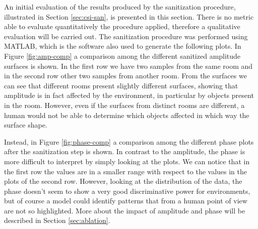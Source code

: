 \documentclass[binding=0.6cm,noexaminfo]{sapthesis}
\begin{document}
An initial evaluation of the results produced by the sanitization procedure, illustrated in Section \ref{sec:csi-san}, is presented in this section. There is no metric able to evaluate quantitatively the procedure applied, therefore a qualitative evaluation will be carried out. The sanitization procedure was performed using MATLAB, which is the software also used to generate the following plots. In Figure \ref{fig:amp-comp} a comparison among the different sanitized amplitude surfaces is shown. In the first row we have two samples from the same room and in the second row other two samples from another room. From the surfaces we can see that different rooms present slightly different surfaces, showing that amplitude is in fact affected by the environment, in particular by objects present in the room. However, even if the surfaces from distinct rooms are different, a human would not be able to determine which objects affected in which way the surface shape.

Instead, in Figure \ref{fig:phase-comp} a comparison among the different phase plots after the sanitization step is shown. In contrast to the amplitude, the phase is more difficult to interpret by simply looking at the plots. We can notice that in the first row the values are in a smaller range with respect to the values in the plots of the second row. However, looking at the distribution of the data, the phase doesn't seem to show a very good discriminative power for environments, but of course a model could identify patterns that from a human point of view are not so highlighted. More about the impact of amplitude and phase will be described in Section \ref{sec:ablation}.
\end{document}
